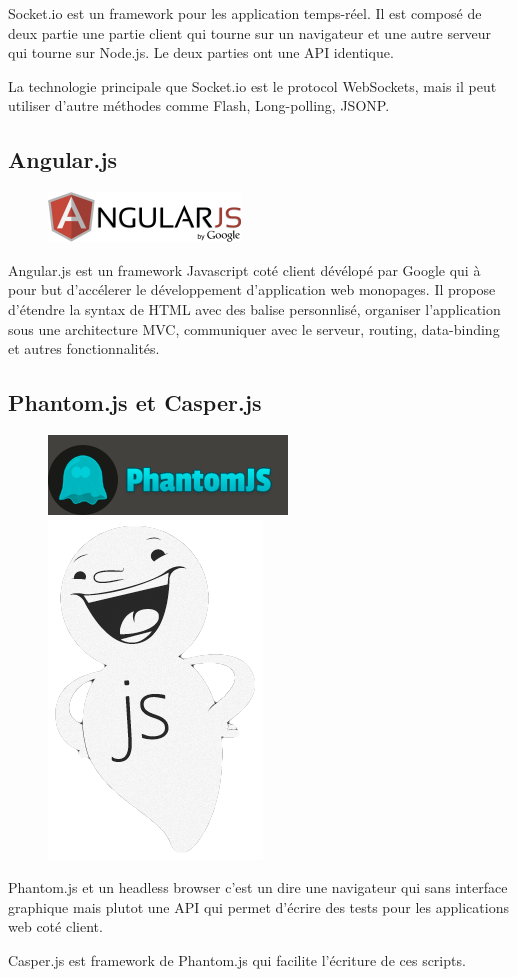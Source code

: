 \documentclass[a4paper]{article}
\begin{document}
Socket.io est un framework pour les application temps-réel. Il est composé de deux 
partie une partie client qui tourne sur un navigateur et une autre serveur qui tourne sur Node.js.
Le deux parties ont une API identique.

La technologie principale que Socket.io est le protocol WebSockets, mais il
peut utiliser d'autre méthodes comme Flash, Long-polling, JSONP.

\subsection{Angular.js}

\begin{figure}[H]
  \begin{center}
  \includegraphics[scale=1]{angularjs.png}
  \end{center}
\end{figure}

Angular.js est un framework Javascript coté client dévélopé par Google
qui à pour but d'accélerer le développement d'application web monopages.
Il propose d'étendre la syntax de HTML avec des balise personnlisé, organiser 
l'application sous une architecture MVC, communiquer avec le serveur, routing, 
data-binding et autres fonctionnalités.

\subsection{Phantom.js et Casper.js}

\begin{figure}[H]
  \begin{center}
  \includegraphics[scale=0.5]{phantomjs.png}
  \includegraphics[scale=0.2]{casperjs.png}
  \end{center}
\end{figure}

Phantom.js et un headless browser c'est un dire une navigateur qui sans interface
graphique mais plutot une API qui permet d'écrire des tests pour les applications
web coté client.

Casper.js est framework de Phantom.js qui facilite l'écriture de ces scripts.
\end{document}
